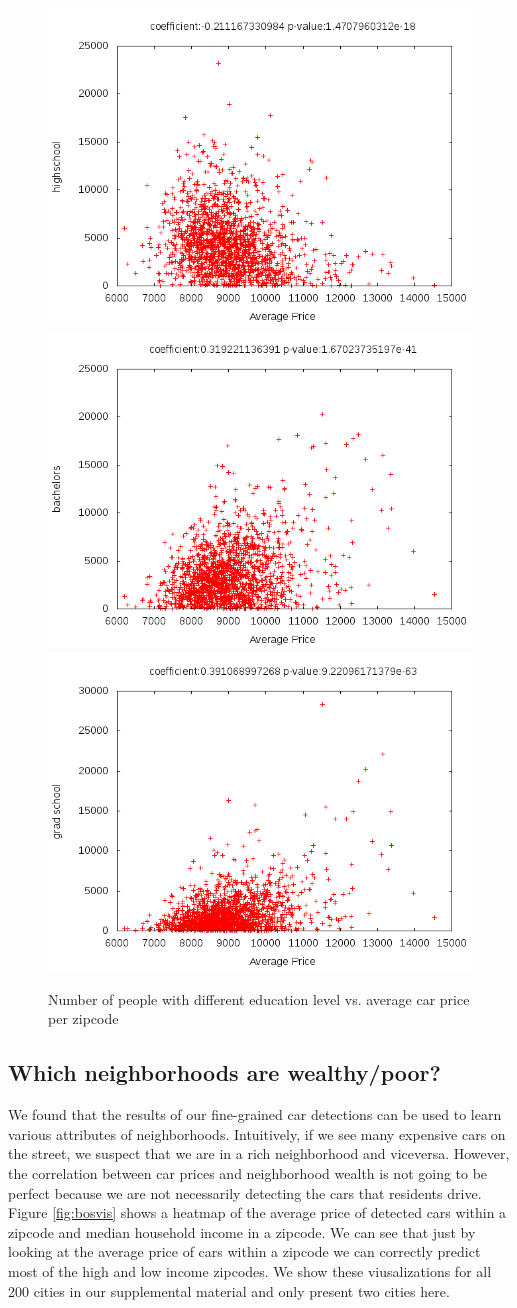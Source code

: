 \documentclass[10pt,twocolumn,letterpaper]{article}
\begin{document}
\begin{figure}[t]
\begin{center}
    \includegraphics[width=0.3\linewidth]{img/averagePriceHighSchool.png}
    \includegraphics[width=0.3\linewidth]{img/averagePriceBachelor.png}
    \includegraphics[width=0.3\linewidth]{img/averagePriceGradSchool.png} 
\end{center}
   \caption {Number of people with different education level vs. average car price per zipcode}
\label{fig:pricetoedu}
\end{figure}

\subsection{Which neighborhoods are wealthy/poor?}
We found that the results of our fine-grained car detections can be used to learn various attributes of neighborhoods. Intuitively, if we see many expensive cars on the street, we suspect that we are in a rich neighborhood and viceversa. However, the correlation between car prices and neighborhood wealth is not going to be perfect because we are not necessarily detecting the cars that residents drive. Figure \ref{fig:bosvis} shows a heatmap of the average price of detected cars within a zipcode and median household income in a zipcode. We can see that just by looking at the average price of cars within a zipcode we can correctly predict most of the high and low income zipcodes. We show these viusalizations for all 200 cities in our supplemental material and only present two cities here.
\end{document}
